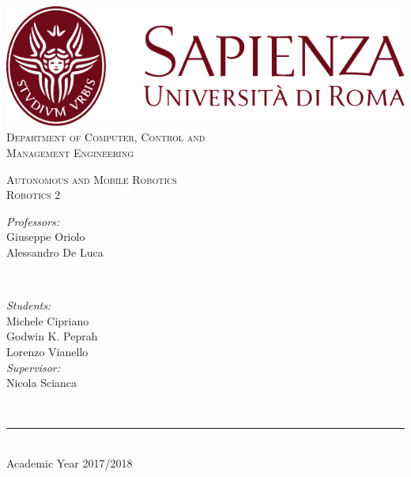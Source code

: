 \documentclass[a4paper]{article}
\begin{document}
\begin{titlepage}
	\centering
    \vspace*{0.5 cm}
    \includegraphics[scale = 0.75]{images/SapienzaLogo}\\[1.0 cm]	%

    \vspace*{-0.3cm}
    \textsc{\large Department of Computer, Control and\\Management Engineering}\\[2.0 cm]	%
    \vspace*{1.2cm}

    { \fontsize{20.74pt}{18.5pt}\selectfont\bfseries \thetitle \par } %

    \vspace*{0.1cm}
    \textsc{\Large Autonomous and Mobile Robotics\\Robotics 2}\\[0.5 cm] %

    \vspace*{2.8cm}
	\begin{minipage}{0.4\textwidth}
		\begin{flushleft} \large
			\emph{Professors:}\\
			Giuseppe Oriolo\\
            Alessandro De Luca\\
		\end{flushleft}
	\end{minipage}~
	\begin{minipage}{0.4\textwidth}
		\begin{flushright} \large
			\emph{Students:} \\
			Michele Cipriano\\
            Godwin K. Peprah\\
            Lorenzo Vianello\\
            \vspace*{0.2cm}
            \emph{Supervisor:}\\
			Nicola Scianca
		\end{flushright}

	\end{minipage}\\[2 cm]

    \vspace{0.2cm}
    \rule{\linewidth}{0.2 mm} \\[0.3 cm]
    \vspace*{-0.3cm}
    Academic Year 2017/2018
\end{titlepage}
\end{document}
